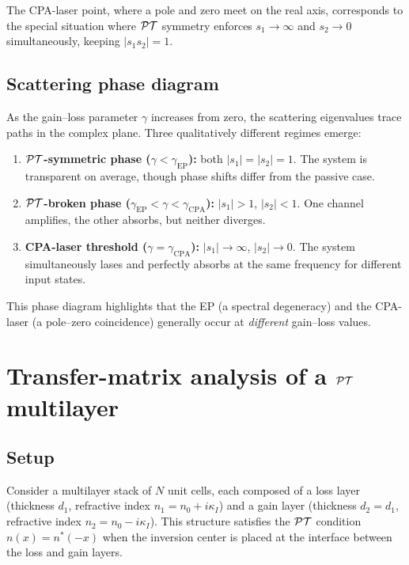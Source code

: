 The CPA-laser point, where a pole and zero meet on the real axis,
corresponds to the special situation where $\mathcal{PT}$ symmetry enforces
$s_1 \to \infty$ and $s_2 \to 0$ simultaneously, keeping
$|s_1 s_2| = 1$.

\subsection{Scattering phase diagram}
\label{ssec:scattering-phase-diagram}

As the gain--loss parameter $\gamma$ increases from zero, the scattering
eigenvalues trace paths in the complex plane. Three qualitatively
different regimes emerge:
\begin{enumerate}
 \item \textbf{$\mathcal{PT}$-symmetric phase ($\gamma < \gamma_{\mathrm{EP}}$):}
 both $|s_1| = |s_2| = 1$. The system is transparent on average,
 though phase shifts differ from the passive case.
 \item \textbf{$\mathcal{PT}$-broken phase ($\gamma_{\mathrm{EP}} < \gamma < \gamma_{\mathrm{CPA}}$):}
 $|s_1| > 1$, $|s_2| < 1$. One channel amplifies, the other absorbs,
 but neither diverges.
 \item \textbf{CPA-laser threshold ($\gamma = \gamma_{\mathrm{CPA}}$):}
 $|s_1| \to \infty$, $|s_2| \to 0$. The system simultaneously lases
 and perfectly absorbs at the same frequency for different input states.
\end{enumerate}
This phase diagram highlights that the EP (a spectral degeneracy) and
the CPA-laser (a pole--zero coincidence) generally occur at
\emph{different} gain--loss values.

\section{Transfer-matrix analysis of a $\mathcal{PT}$ multilayer}
\label{sec:pt-multilayer}

\subsection{Setup}
\label{ssec:multilayer-setup}

Consider a multilayer stack of $N$ unit cells, each composed of a loss
layer (thickness $d_1$, refractive index $n_1 = n_0 + i\kappa_I$) and a
gain layer (thickness $d_2 = d_1$, refractive index
$n_2 = n_0 - i\kappa_I$). This structure satisfies the $\mathcal{PT}$ condition
$n(x) = n^*(-x)$ when the inversion center is placed at the interface
between the loss and gain layers.

